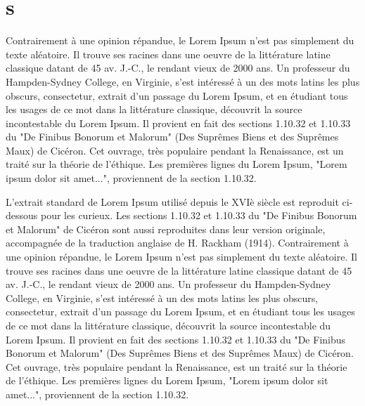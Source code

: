 \documentclass{book}
\begin{document}
\chapter{s}

\beginnumbering
\pstart





Contrairement à une opinion répandue, le Lorem Ipsum n'est pas simplement du texte aléatoire. Il trouve ses racines dans une oeuvre de la littérature latine classique datant de 45 av. J.-C., le rendant vieux de 2000 ans.  Un professeur du Hampden-Sydney College, en Virginie, s'est intéressé à un des mots latins les plus obscurs, consectetur, extrait d'un passage du Lorem Ipsum, et en étudiant tous les usages de ce mot dans la littérature classique, découvrit la source incontestable du Lorem Ipsum. Il provient en fait des sections 1.10.32 et 1.10.33 du "De Finibus Bonorum et Malorum" (Des Suprêmes Biens et des Suprêmes Maux) de Cicéron. Cet ouvrage, très populaire pendant la Renaissance, est un traité sur la théorie de l'éthique. Les premières lignes du Lorem Ipsum, "Lorem ipsum dolor sit amet...", proviennent de la section 1.10.32.



L'extrait standard de Lorem Ipsum utilisé depuis le XVIè siècle est reproduit ci-dessous pour les curieux. Les sections 1.10.32 et 1.10.33 du "De Finibus Bonorum et Malorum" de Cicéron sont aussi reproduites dans leur version originale, accompagnée de la traduction anglaise de H. Rackham (1914).
Contrairement à une opinion répandue, le Lorem Ipsum n'est pas simplement du texte aléatoire. Il trouve ses racines dans une oeuvre de la littérature latine classique datant de 45 av. J.-C., le rendant vieux de 2000 ans. Un professeur du Hampden-Sydney College, en Virginie, s'est intéressé à un des mots latins les plus obscurs, consectetur, extrait d'un passage du Lorem Ipsum, et en étudiant tous les usages de ce mot dans la littérature classique, découvrit la source incontestable du Lorem Ipsum. Il provient en fait des sections 1.10.32 et 1.10.33 du "De Finibus Bonorum et Malorum" (Des Suprêmes Biens et des Suprêmes Maux) de Cicéron. Cet ouvrage, très populaire pendant la Renaissance, est un traité sur la théorie de l'éthique. Les premières lignes du Lorem Ipsum, "Lorem ipsum dolor sit amet...", proviennent de la section 1.10.32.
\end{document}
